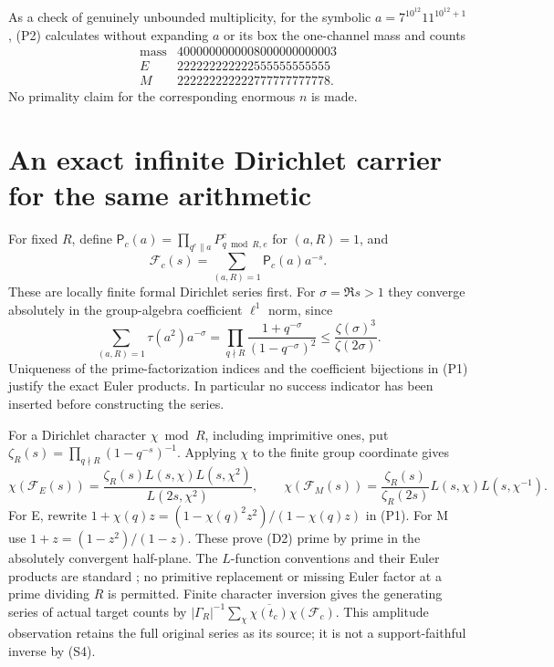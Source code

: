 As a check of genuinely unbounded multiplicity, for the symbolic
$a=7^{10^{12}}11^{10^{12}+1}$, (P2) calculates without expanding $a$ or its
box the one-channel mass and counts
\[
\begin{array}{c|r}
\text{mass}&4000000000008000000000003\\
E&222222222222555555555555\\
M&222222222222777777777778.
\end{array}
\]
No primality claim for the corresponding enormous $n$ is made.

\section{An exact infinite Dirichlet carrier for the same arithmetic}
For fixed $R$, define $\mathsf P_c(a)=\prod_{q^e\parallel a}P^c_{q\bmod R,e}$
for $(a,R)=1$, and
\[
 \mathscr F_c(s)=\sum_{(a,R)=1}\mathsf P_c(a)a^{-s}.
\]
These are locally finite formal Dirichlet series first. For $\sigma=\Re s>1$
they converge absolutely in the group-algebra coefficient $\ell^1$ norm, since
\[
 \sum_{(a,R)=1}\tau(a^2)a^{-\sigma}
 =\prod_{q\nmid R}\frac{1+q^{-\sigma}}{(1-q^{-\sigma})^2}
 \le\frac{\zeta(\sigma)^3}{\zeta(2\sigma)}.
 \tag{D1}
\]
Uniqueness of the prime-factorization indices and the coefficient bijections
in (P1) justify the exact Euler products. In particular no success indicator
has been inserted before constructing the series.

For a Dirichlet character $\chi\bmod R$, including imprimitive ones, put
$\zeta_R(s)=\prod_{q\nmid R}(1-q^{-s})^{-1}$. Applying $\chi$ to the
finite group coordinate gives
\[
 \boxed{
 \chi(\mathscr F_E(s))=
 \frac{\zeta_R(s)L(s,\chi)L(s,\chi^2)}{L(2s,\chi^2)},\qquad
 \chi(\mathscr F_M(s))=
 \frac{\zeta_R(s)}{\zeta_R(2s)}L(s,\chi)L(s,\chi^{-1}).}
 \tag{D2}
\]
For E, rewrite $1+\chi(q)z=(1-\chi(q)^2z^2)/(1-\chi(q)z)$ in (P1).
For M use $1+z=(1-z^2)/(1-z)$. These prove (D2) prime by prime in the
absolutely convergent half-plane. The $L$-function conventions and their
Euler products are standard \cite[25.15.1--25.15.4]{DLMF}; no primitive
replacement or missing Euler factor at a prime dividing $R$ is permitted.
Finite character inversion gives the generating series of actual target
counts by $|\Gamma_R|^{-1}\sum_\chi\overline{\chi(t_c)}\chi(\mathscr F_c)$.
This amplitude observation retains the full original series as its source;
it is not a support-faithful inverse by (S4).

